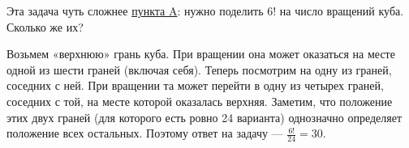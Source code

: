 ﻿
\begin{itemize}
\itA {}

\itB {}

\itC Эта задача чуть сложнее \hyperref[mgap-ba]{пункта A}: нужно поделить $6!$ на число вращений куба. Сколько же их?

\ms Возьмем «верхнюю» грань куба. При вращении она может оказаться на месте одной из шести граней (включая себя). Теперь посмотрим на одну из граней, соседних с ней. При вращении та может перейти в одну из четырех граней, соседних с той, на месте которой оказалась верхняя. Заметим, что положение этих двух граней (для которого есть ровно 24 варианта) однозначно определяет положение всех остальных. Поэтому ответ на задачу — $\tfrac{6!}{24} = 30$.
\end{itemize}